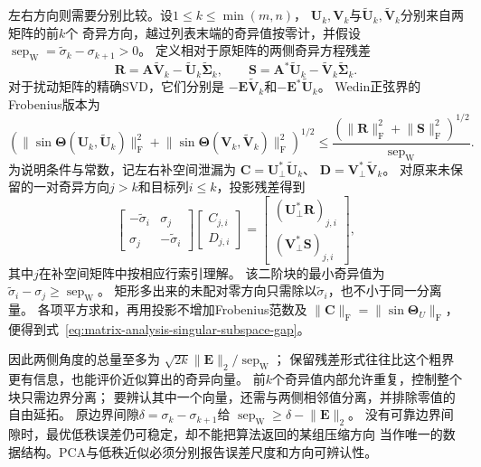 左右方向则需要分别比较。设$1\leq k\leq\min(m,n)$，
$\bm U_k,\bm V_k$与$\widetilde{\bm U}_k,\widetilde{\bm V}_k$分别来自两矩阵的前$k$个
奇异方向，越过列表末端的奇异值按零计，并假设
$\operatorname{sep}_{\mathrm W}=\widetilde\sigma_k-\sigma_{k+1}>0$。
定义相对于原矩阵的两侧奇异方程残差
\[
 \bm R=\bm A\widetilde{\bm V}_k
        -\widetilde{\bm U}_k\widetilde{\bm\Sigma}_k,\qquad
 \bm S=\bm A^*\widetilde{\bm U}_k
        -\widetilde{\bm V}_k\widetilde{\bm\Sigma}_k.
\]
对于扰动矩阵的精确SVD，它们分别是
$-\bm E\widetilde{\bm V}_k$和$-\bm E^*\widetilde{\bm U}_k$。
Wedin正弦界的Frobenius版本为
\begin{equation}
 \left(
  \lVert\sin\bm\Theta(\bm U_k,\widetilde{\bm U}_k)\rVert_{\mathrm F}^2+
  \lVert\sin\bm\Theta(\bm V_k,\widetilde{\bm V}_k)\rVert_{\mathrm F}^2
 \right)^{1/2}
 \leq
 \frac{(\lVert\bm R\rVert_{\mathrm F}^2+\lVert\bm S\rVert_{\mathrm F}^2)^{1/2}}
      {\operatorname{sep}_{\mathrm W}}.
 \label{eq:matrix-analysis-singular-subspace-gap}
\end{equation}
为说明条件与常数，记左右补空间泄漏为
$\bm C=\bm U_\perp^*\widetilde{\bm U}_k$、
$\bm D=\bm V_\perp^*\widetilde{\bm V}_k$。
对原来未保留的一对奇异方向$j>k$和目标列$i\leq k$，投影残差得到
\[
 \begin{bmatrix}-\widetilde\sigma_i&\sigma_j\\
                 \sigma_j&-\widetilde\sigma_i\end{bmatrix}
 \begin{bmatrix}C_{j,i}\\D_{j,i}\end{bmatrix}
 =\begin{bmatrix}(\bm U_\perp^*\bm R)_{j,i}\\
                  (\bm V_\perp^*\bm S)_{j,i}\end{bmatrix},
\]
其中$j$在补空间矩阵中按相应行索引理解。
该二阶块的最小奇异值为$\widetilde\sigma_i-\sigma_j
\geq\operatorname{sep}_{\mathrm W}$。
矩形多出来的未配对零方向只需除以$\widetilde\sigma_i$，也不小于同一分离量。
各项平方求和，再用投影不增加Frobenius范数及
$\lVert\bm C\rVert_{\mathrm F}=\lVert\sin\bm\Theta_U\rVert_{\mathrm F}$，
便得到式~\eqref{eq:matrix-analysis-singular-subspace-gap}。

因此两侧角度的总量至多为
$\sqrt{2k}\lVert\bm E\rVert_2/\operatorname{sep}_{\mathrm W}$；
保留残差形式往往比这个粗界更有信息，也能评价近似算出的奇异向量。
前$k$个奇异值内部允许重复，控制整个块只需边界分离；
要辨认其中一个向量，还需与两侧相邻值分离，并排除零值的自由延拓。
原边界间隙$\delta=\sigma_k-\sigma_{k+1}$给
$\operatorname{sep}_{\mathrm W}\geq\delta-\lVert\bm E\rVert_2$。
没有可靠边界间隙时，最优低秩误差仍可稳定，却不能把算法返回的某组压缩方向
当作唯一的数据结构。PCA与低秩近似必须分别报告误差尺度和方向可辨认性。

